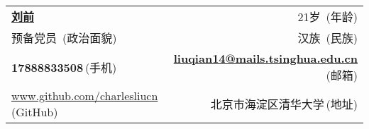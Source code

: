 \newcommand{\myheader}{
\begin{tabular*}{\textwidth}{l@{\extracolsep{\fill}}r}
  \textbf{\href{http://www.github.com/charlesliucn}{\LARGE 刘前}} &21岁$\,$ {\color{labelgrey}(年龄)} \\
  预备党员 $\,${\color{labelgrey}(政治面貌)} & 汉族 $\,${\color{labelgrey}(民族)}\\
  \textbf{17888833508}$\,${\color{labelgrey}(手机)} & \href{mailto:liuqian14@mails.tsinghua.edu.cn}{\textbf{liuqian14@mails.tsinghua.edu.cn}}$\,${\color{labelgrey}(邮箱)}\\
  \href{http://www.github.com/charlesliucn}{www.github.com/charlesliucn}$\,${\color{labelgrey}(GitHub)} & 北京市海淀区清华大学$\,${\color{labelgrey}(地址)}\\
  \end{tabular*}\\\vspace{0.15in}}

\myheader